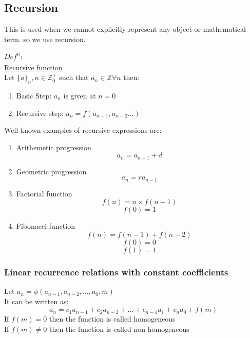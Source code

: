 \documentclass[11pt,letterpaper]{article}
\newenvironment{definition}
	{\begin{mdframed}$\underline{\textit{Def}^\textit{n}:} $\\}
	{\end{mdframed}}
\begin{document}
\subsection{Recursion}
This is used when we cannot explicitly represent any object or mathematical term. so we use recursion.\\
\begin{definition}
  \underline{Recursive function}\\
  Let $\{a\}_n, n \in \mathbb{Z}^+_0$ such that $a_n\in \mathbb{Z} \forall n$ then:
  \begin{enumerate}
    \item Basic Step: $a_n$ is given at $n = 0$
    \item Recursive step: $a_n = f(a_{n-1},a_{n-2} \dots)$
  \end{enumerate}
\end{definition}
Well known examples of recursive expressions are: 
\begin{enumerate}
  \item Arithemetic progression
    \[
      a_n = a_{n-1} + d
    \]
  \item Geometric progression
    \[
      a_n = ra_{n-1}
    \]
  \item Factorial function
    \[
      f(n) = n \times f(n-1)
    \]
    \[
      f(0) = 1
    \]
  \item Fibonacci function
    \[
      f(n) = f(n-1) + f(n-2)
    \]
    \[
      f(0) = 0
    \]
    \[
      f(1) = 1
    \]
\end{enumerate}
\subsubsection{Linear recurrence relations with constant coefficients}
Let $a_n = \phi(a_{n-1},a_{n-2},\dots,a_{0},m)$\\ 
It can be written as:
\[
  a_n = c_1 a_{n-1} + c_2 a_{n-2} + \dots + c_{n-1} a_1 + c_n a_0 + f(m)
\]
If $f(m) = 0$ then the function is called homogeneous\\
If $f(m) \neq 0$ then the function is called non-homogeneous\\

\vspace{1cm}
\end{document}
